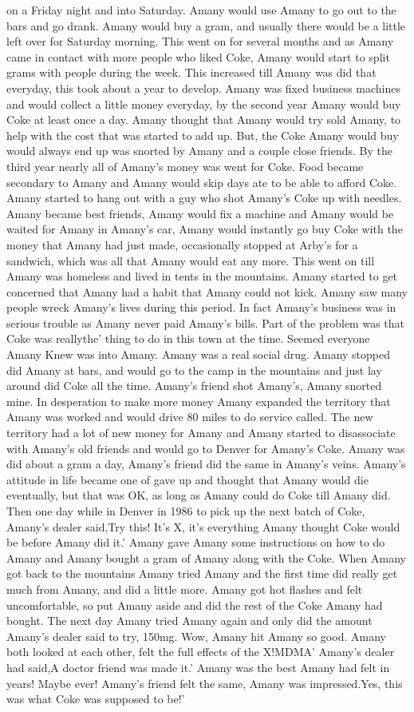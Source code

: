 \documentclass[12pt]{book}
\begin{document}
on a Friday night and into Saturday. Amany would use Amany to go out to the bars and go drank. Amany would buy a gram, and usually there would be a little left over for Saturday morning. This went on for several months and as Amany came in contact with more people who liked Coke, Amany would start to split grams with people during the week. This increased till Amany was did that everyday, this took about a year to develop. Amany was fixed business machines and would collect a little money everyday, by the second year Amany would buy Coke at least once a day. Amany thought that Amany would try sold Amany, to help with the cost that was started to add up. But, the Coke Amany would buy would always end up was snorted by Amany and a couple close friends. By the third year nearly all of Amany's money was went for Coke. Food became secondary to Amany and Amany would skip days ate to be able to afford Coke. Amany started to hang out with a guy who shot Amany's Coke up with needles. Amany became best friends, Amany would fix a machine and Amany would be waited for Amany in Amany's car, Amany would instantly go buy Coke with the money that Amany had just made, occasionally stopped at Arby's for a sandwich, which was all that Amany would eat any more. This went on till Amany was homeless and lived in tents in the mountains. Amany started to get concerned that Amany had a habit that Amany could not kick. Amany saw many people wreck Amany's lives during this period. In fact Amany's business was in serious trouble as Amany never paid Amany's bills. Part of the problem was that Coke was reallythe' thing to do in this town at the time. Seemed everyone Amany Knew was into Amany. Amany was a real social drug. Amany stopped did Amany at bars, and would go to the camp in the mountains and just lay around did Coke all the time. Amany's friend shot Amany's, Amany snorted mine. In desperation to make more money Amany expanded the territory that Amany was worked and would drive 80 miles to do service called. The new territory had a lot of new money for Amany and Amany started to disassociate with Amany's old friends and would go to Denver for Amany's Coke. Amany was did about a gram a day, Amany's friend did the same in Amany's veins. Amany's attitude in life became one of gave up and thought that Amany would die eventually, but that was OK, as long as Amany could do Coke till Amany did. Then one day while in Denver in 1986 to pick up the next batch of Coke, Amany's dealer said,Try this! It's X, it's everything Amany thought Coke would be before Amany did it.' Amany gave Amany some instructions on how to do Amany and Amany bought a gram of Amany along with the Coke. When Amany got back to the mountains Amany tried Amany and the first time did really get much from Amany, and did a little more. Amany got hot flashes and felt uncomfortable, so put Amany aside and did the rest of the Coke Amany had bought. The next day Amany tried Amany again and only did the amount Amany's dealer said to try, 150mg. Wow, Amany hit Amany so good. Amany both looked at each other, felt the full effects of the X!MDMA' Amany's dealer had said,A doctor friend was made it.' Amany was the best Amany had felt in years! Maybe ever! Amany's friend felt the same, Amany was impressed.Yes, this was what Coke was supposed to be!' 
\end{document}
